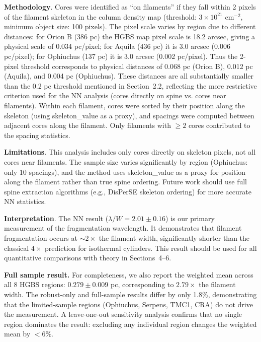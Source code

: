 \documentclass[twocolumn,usenatbib]{mnras}
\begin{document}
\noindent\textbf{Methodology}. Cores were identified as ``on filaments'' if they fall within 2 pixels of the filament skeleton in the column density map (threshold: $3\times10^{21}$ cm$^{-2}$, minimum object size: 100 pixels). The pixel scale varies by region due to different distances: for Orion B (386 pc) the HGBS map pixel scale is 18.2 arcsec, giving a physical scale of 0.034 pc/pixel; for Aquila (436 pc) it is 3.0 arcsec (0.006 pc/pixel); for Ophiuchus (137 pc) it is 3.0 arcsec (0.002 pc/pixel). Thus the 2-pixel threshold corresponds to physical distances of 0.068 pc (Orion B), 0.012 pc (Aquila), and 0.004 pc (Ophiuchus). These distances are all substantially smaller than the 0.2 pc threshold mentioned in Section~2.2, reflecting the more restrictive criterion used for the NN analysis (cores directly on spine vs. cores near filaments). Within each filament, cores were sorted by their position along the skeleton (using skeleton\_value as a proxy), and spacings were computed between adjacent cores along the filament. Only filaments with $\geq 2$ cores contributed to the spacing statistics.

\noindent\textbf{Limitations}. This analysis includes only cores directly on skeleton pixels, not all cores near filaments. The sample size varies significantly by region (Ophiuchus: only 10 spacings), and the method uses skeleton\_value as a proxy for position along the filament rather than true spine ordering. Future work should use full spine extraction algorithms (e.g., DisPerSE skeleton ordering) for more accurate NN statistics.

\noindent\textbf{Interpretation}. The NN result ($\lambda/W = 2.01 \pm 0.16$) is our primary measurement of the fragmentation wavelength. It demonstrates that filament fragmentation occurs at $\sim2\times$ the filament width, significantly shorter than the classical $4\times$ prediction for isothermal cylinders. This result should be used for all quantitative comparisons with theory in Sections~4--6.

\textbf{Full sample result.} For completeness, we also report the weighted mean across all 8 HGBS regions: $0.279 \pm 0.009$ pc, corresponding to $2.79\times$ the filament width. The robust-only and full-sample results differ by only 1.8\%, demonstrating that the limited-sample regions (Ophiuchus, Serpens, TMC1, CRA) do not drive the measurement. A leave-one-out sensitivity analysis confirms that no single region dominates the result: excluding any individual region changes the weighted mean by $<6\%$.
\end{document}
